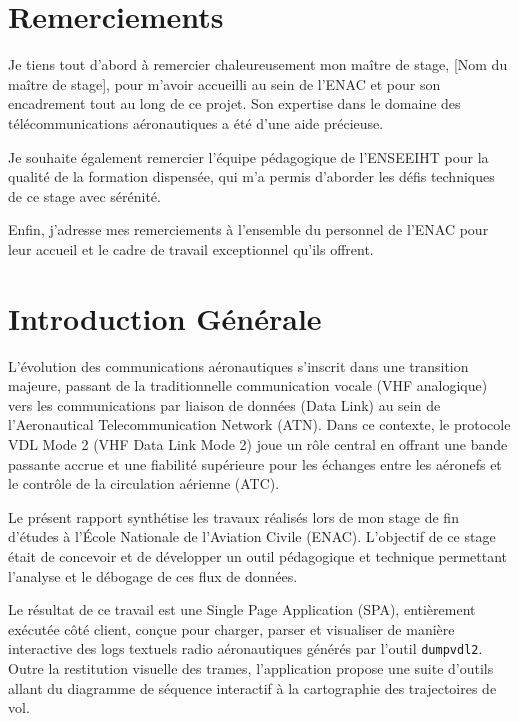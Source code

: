 \documentclass[a4paper,11pt]{report}
\begin{document}
\chapter*{Remerciements}
Je tiens tout d'abord à remercier chaleureusement mon maître de stage, [Nom du maître de stage], pour m'avoir accueilli au sein de l'ENAC et pour son encadrement tout au long de ce projet. Son expertise dans le domaine des télécommunications aéronautiques a été d'une aide précieuse.

Je souhaite également remercier l'équipe pédagogique de l'ENSEEIHT pour la qualité de la formation dispensée, qui m'a permis d'aborder les défis techniques de ce stage avec sérénité.

Enfin, j'adresse mes remerciements à l'ensemble du personnel de l'ENAC pour leur accueil et le cadre de travail exceptionnel qu'ils offrent.

\tableofcontents
\newpage

\chapter*{Introduction Générale}

L'évolution des communications aéronautiques s'inscrit dans une transition majeure, passant de la traditionnelle communication vocale (VHF analogique) vers les communications par liaison de données (Data Link) au sein de l'Aeronautical Telecommunication Network (ATN). Dans ce contexte, le protocole VDL Mode 2 (VHF Data Link Mode 2) joue un rôle central en offrant une bande passante accrue et une fiabilité supérieure pour les échanges entre les aéronefs et le contrôle de la circulation aérienne (ATC).

Le présent rapport synthétise les travaux réalisés lors de mon stage de fin d'études à l'École Nationale de l'Aviation Civile (ENAC). L'objectif de ce stage était de concevoir et de développer un outil pédagogique et technique permettant l'analyse et le débogage de ces flux de données. 

Le résultat de ce travail est une Single Page Application (SPA), entièrement exécutée côté client, conçue pour charger, parser et visualiser de manière interactive des logs textuels radio aéronautiques générés par l'outil \texttt{dumpvdl2}. Outre la restitution visuelle des trames, l'application propose une suite d'outils allant du diagramme de séquence interactif à la cartographie des trajectoires de vol.
\end{document}
